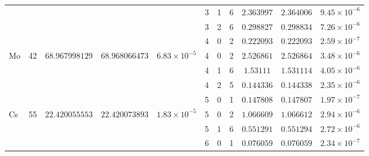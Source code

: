 \begin{table}[!htbp]
\begin{tabular}{@{}l c ccc ccc ccc@{}}
         &  &  &  &  & 3 & 1 & 6 & $2.363997$ & $2.364006$ & $9.45 \times 10^{-6}$ \\
         &  &  &  &  & 3 & 2 & 6 & $0.298827$ & $0.298834$ & $7.26 \times 10^{-6}$ \\
         &  &  &  &  & 4 & 0 & 2 & $0.222093$ & $0.222093$ & $2.59 \times 10^{-7}$ \\
        \multirow[t]{4}{*}{Mo} & \multirow[t]{4}{*}{42} & \multirow[t]{4}{*}{$68.967998129$} & \multirow[t]{4}{*}{$68.968066473$} & \multirow[t]{4}{*}{$6.83 \times 10^{-5}$} & 4 & 0 & 2 & $2.526861$ & $2.526864$ & $3.48 \times 10^{-6}$ \\
         &  &  &  &  & 4 & 1 & 6 & $1.53111$ & $1.531114$ & $4.05 \times 10^{-6}$ \\
         &  &  &  &  & 4 & 2 & 5 & $0.144336$ & $0.144338$ & $2.35 \times 10^{-6}$ \\
         &  &  &  &  & 5 & 0 & 1 & $0.147808$ & $0.147807$ & $1.97 \times 10^{-7}$ \\
        \multirow[t]{3}{*}{Cs} & \multirow[t]{3}{*}{55} & \multirow[t]{3}{*}{$22.420055553$} & \multirow[t]{3}{*}{$22.420073893$} & \multirow[t]{3}{*}{$1.83 \times 10^{-5}$} & 5 & 0 & 2 & $1.066609$ & $1.066612$ & $2.94 \times 10^{-6}$ \\
         &  &  &  &  & 5 & 1 & 6 & $0.551291$ & $0.551294$ & $2.72 \times 10^{-6}$ \\
         &  &  &  &  & 6 & 0 & 1 & $0.076059$ & $0.076059$ & $2.34 \times 10^{-7}$ \\
        \bottomrule
    \end{tabular}
\end{table}
